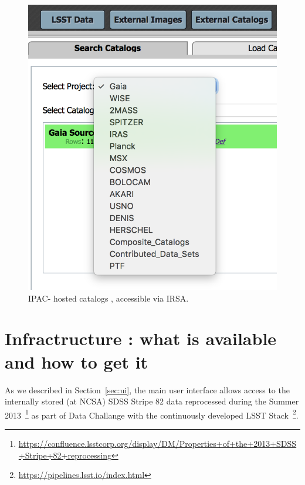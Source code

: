 \documentclass[DM,lsstdraft,toc,usenatbib]{lsstdoc}
\begin{document}
\begin{figure}
\begin{centering}
\includegraphics[width=0.5\columnwidth]{figs/2_PDAC_externals}
\caption{IPAC- hosted catalogs , accessible via IRSA. }
\label{fig:PDAC_external_cat}
\end{centering}
\end{figure}




\section{Infractructure : what is available and how to get it }
\label{sec:infra}


As we described in Section~\ref{sec:ui}, the main user interface allows access to the internally stored (at NCSA) SDSS Stripe 82 data reprocessed during the Summer 2013~\footnote{\url{https://confluence.lsstcorp.org/display/DM/Properties+of+the+2013+SDSS+Stripe+82+reprocessing}} as part of Data Challange with the continuously developed LSST Stack~\footnote{\url{https://pipelines.lsst.io/index.html}}. 
\end{document}

